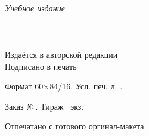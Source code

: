 \newpage
\thispagestyle{empty}
~\vfill
\begin{centering}
  \textit{Учебное издание}\\[18pt]
  \AuthorI\\[6pt]
  {\large\Title}\\[6pt]
  \PubType\\[18pt]
  Издаётся в авторской редакции\\
  \vspace{18pt}
  Подписано в печать \PUBDATE

  Формат 60×84/16. Усл. печ. л. \SHEETS.
  
  Заказ №\,\PUBORDER. Тираж \PUBCOUNT\ экз.

  \vspace{6pt}

  Отпечатано с готового оргинал-макета

  \PUBLISHER

  \PUBADDR
  
  \LICENSE
  
\end{centering}
\vspace{1cm}
